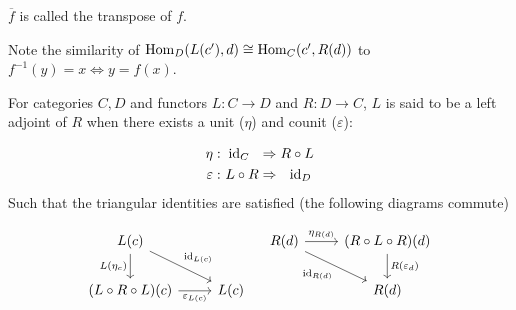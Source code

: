 \begin{remark}
  $\overline{f}$ is called the transpose of $f$.
\end{remark}

\begin{remark}
  Note the similarity of $\mathrm{Hom}_D(L(c'), d)\cong \mathrm{Hom}_C(c', R(d))$ to
  $f^{-1}(y)=x \iff y=f(x)$.
\end{remark}

\begin{definition}\label{def:adjoint_unit_counit}
  For categories $C,D$ and functors $L: C\to D$ and $R: D\to C$, $L$ is said to
  be a left adjoint of $R$ when there exists a unit ($\eta$) and counit
  ($\varepsilon$): \parencite{leinster:basic_category_theory}

  \[
    \begin{aligned}
      \eta&:\\
      \varepsilon&:
    \end{aligned}
    \ \begin{aligned}
      \mathrm{id}_C\ \ &\Rightarrow R \circ L\\
      L \circ R &\Rightarrow\ \ \mathrm{id}_D
    \end{aligned}
  \]
  Such that the triangular identities are satisfied (the following diagrams
  commute)

  \[\begin{tikzcd}[ampersand replacement=\&]
    {L(c)} \\
    {(L\circ R\circ L)(c)} \& {L(c)}
    \arrow["{L(\eta_c)}"', from=1-1, to=2-1]
    \arrow["{\varepsilon_{L(c)}}"', from=2-1, to=2-2]
    \arrow["{\id_{L(c)}}", from=1-1, to=2-2]
  \end{tikzcd}
  \quad
  \begin{tikzcd}[ampersand replacement=\&]
    {R(d)} \& {(R\circ L\circ R)(d)} \\
    \& {R(d)}
    \arrow["{\eta_{R(d)}}", from=1-1, to=1-2]
    \arrow["{R(\varepsilon_d)}", from=1-2, to=2-2]
    \arrow["{\id_{R(d)}}"', from=1-1, to=2-2]
  \end{tikzcd}\]
\end{definition}


